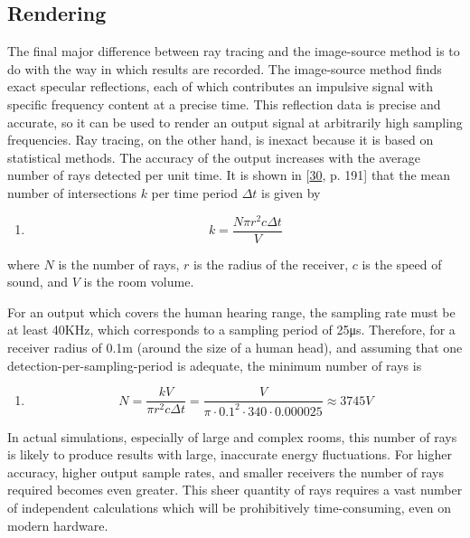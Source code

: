 \documentclass[]{scrreprt}
\providecommand{\tightlist}{%
  \setlength{\itemsep}{0pt}\setlength{\parskip}{0pt}}
\begin{document}
\subsection{Rendering}\label{rendering}

The final major difference between ray tracing and the image-source
method is to do with the way in which results are recorded. The
image-source method finds exact specular reflections, each of which
contributes an impulsive signal with specific frequency content at a
precise time. This reflection data is precise and accurate, so it can be
used to render an output signal at arbitrarily high sampling
frequencies. Ray tracing, on the other hand, is inexact because it is
based on statistical methods. The accuracy of the output increases with
the average number of rays detected per unit time. It is shown in
{[}\protect\hyperlink{ref-vorlanderux5fauralization:ux5f2007}{30}, p.
191{]} that the mean number of intersections \(k\) per time period
\(\Delta t\) is given by

\begin{enumerate}
\def\labelenumi{(\arabic{enumi})}
\setcounter{enumi}{5}
\tightlist
\item
  \[k=\frac{N\pi r^2c\Delta t}{V}\]
\end{enumerate}

where \(N\) is the number of rays, \(r\) is the radius of the receiver,
\(c\) is the speed of sound, and \(V\) is the room volume.

For an output which covers the human hearing range, the sampling rate
must be at least 40KHz, which corresponds to a sampling period of 25μs.
Therefore, for a receiver radius of 0.1m (around the size of a human
head), and assuming that one detection-per-sampling-period is adequate,
the minimum number of rays is

\begin{enumerate}
\def\labelenumi{(\arabic{enumi})}
\setcounter{enumi}{6}
\tightlist
\item
  \[N=\frac{kV}{\pi r^2c\Delta t} = \frac{V}{\pi \cdot 0.1^2 \cdot 340 \cdot
  0.000025 } \approx 3745V\]
\end{enumerate}

In actual simulations, especially of large and complex rooms, this
number of rays is likely to produce results with large, inaccurate
energy fluctuations. For higher accuracy, higher output sample rates,
and smaller receivers the number of rays required becomes even greater.
This sheer quantity of rays requires a vast number of independent
calculations which will be prohibitively time-consuming, even on modern
hardware.
\end{document}

